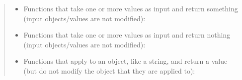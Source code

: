 \documentclass[letterpaper,10pt,english]{sphinxmanual}
\begin{document}
\begin{quote}
\begin{itemize}
\item {} 
Functions that take one or more values as input and return
something (input objects/values are not modified):

\end{itemize}
\begin{quote}

\begin{sphinxVerbatim}[commandchars=\\\{\}]
  
  
\end{sphinxVerbatim}
\end{quote}
\begin{itemize}
\item {} 
Functions that take one or more values as input and return
nothing (input objects/values are not modified):

\end{itemize}
\begin{quote}

\begin{sphinxVerbatim}[commandchars=\\\{\}]
  
      
  
  
 
\end{sphinxVerbatim}
\end{quote}
\begin{itemize}
\item {} 
Functions that apply to an object, like a string, and return a
value (but do not modify the object that they are applied to):


\end{itemize}
\end{quote}
\end{document}

